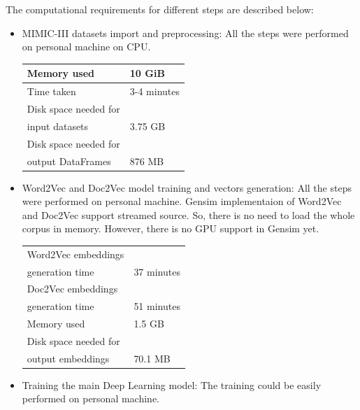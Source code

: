 \documentclass[11pt,a4paper]{article}
\begin{document}
The computational requirements for different steps are described below:
\begin{itemize}
	\item MIMIC-III datasets import and preprocessing: All the steps were performed on personal machine on CPU.
\newline

\begin{small}
\begin{tabular}{ ll }
	\hline
   		Memory used & 10 GiB \\
  	\hline
    		Time taken & 3-4 minutes \\
    \hline
    		Disk space needed for \\ input datasets & 3.75 GB \\
    	\hline
    		Disk space needed for \\ output DataFrames & 876 MB \\		 
  	\hline
\end{tabular}
\end{small}
\newline

	\item Word2Vec and Doc2Vec model training and vectors generation: All the steps were performed on personal machine. Gensim implementaion of Word2Vec and Doc2Vec support streamed source. So, there is no need to load the whole corpus in memory. However, there is no GPU support in Gensim yet.
\newline

\begin{small}
\begin{tabular}{ ll }
	\hline
   		Word2Vec embeddings \\ generation time & 37 minutes \\
  	\hline
    		Doc2Vec embeddings \\ generation time & 51 minutes \\ 
  	\hline
  		Memory used & 1.5 GB \\
  	\hline
  		Disk space needed for \\ output embeddings & 70.1 MB \\
  	\hline
\end{tabular}
\end{small}
\newline
	\item Training the main Deep Learning model: The training could be easily performed on personal machine.
\newline


\end{itemize}
\end{document}
